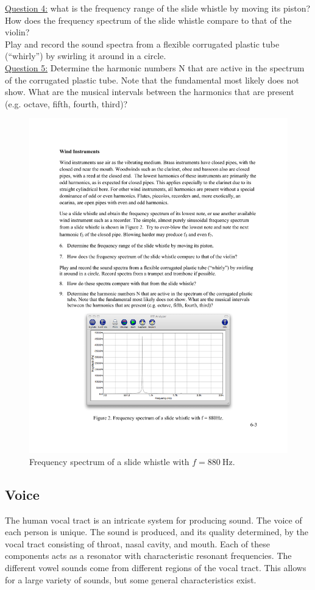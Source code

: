 \documentclass[11pt]{NSF}
\begin{document}
\underline{Question 4:} what is the frequency range of the slide whistle by moving its piston?
How does the frequency spectrum of the slide whistle compare to that of the violin? \\

Play and record the sound spectra from a flexible corrugated plastic tube (“whirly”) by swirling
it around in a circle. \\

\underline{Question 5:} Determine the harmonic numbers N that are active in the spectrum of the corrugated plastic
tube. Note that the fundamental most likely does not show. What are the musical intervals
between the harmonics that are present (e.g. octave, fifth, fourth, third)?

%
\begin{figure}[hbtp]
\begin{center}
\includegraphics[width=.6\textwidth]{fig6_2}
\caption{Frequency spectrum of a slide whistle with 
$f =880~\textrm{Hz}$.}
\label{f:2}
\end{center}
\end{figure}


\subsection{Voice}

The human vocal tract is an intricate system for producing sound. The
voice of each person is unique. The sound is produced, and its quality
determined, by the vocal tract consisting of throat, nasal cavity, and
mouth. Each of these components acts as a resonator with
characteristic resonant frequencies. The different vowel sounds come
from different regions of the vocal tract. This allows for a large
variety of sounds, but some general characteristics exist. \\
\end{document}
